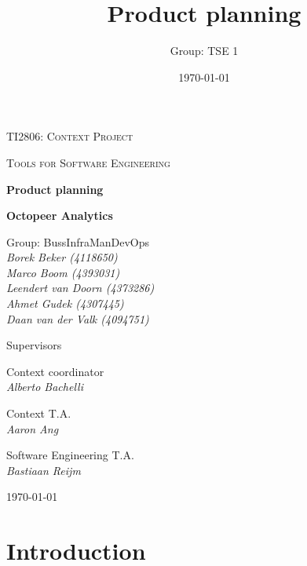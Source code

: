 \documentclass{article}
\title{Product planning}
\author{Group: TSE 1}
\date{\today}
\begin{document}
\begin{titlepage}
	\centering
	{\scshape\LARGE TI2806: Context Project \par}
	\vspace{1cm}
	{\scshape\Large Tools for Software Engineering\par}
	\vspace{1.5cm}
	{\huge\bfseries Product planning\par}
	\vspace{0.5cm}
	{\Large\bfseries Octopeer Analytics\par}
	\vspace{2cm}
	{\Large
	  Group: BussInfraManDevOps \\
	  \vspace{0.5cm}
	  \itshape
        Borek Beker \textnormal{(4118650)}\\
        Marco Boom \textnormal{(4393031)}\\
        Leendert van Doorn \textnormal{(4373286)}\\
        Ahmet Gudek \textnormal{(4307445)}\\
        Daan van der Valk \textnormal{(4094751)}\\
    \par}
\vspace{1cm}
	{\LARGE
	  Supervisors \\
	  \Large
	  \vspace{0.2cm}
        
        \begin{multicols}{3}
        Context coordinator\\
        \textit{Alberto Bachelli}
        \columnbreak
        
        
        Context T.A.\\
        \textit{Aaron Ang}\\
        \columnbreak
        
        
        Software Engineering T.A.\\
        \textit{Bastiaan Reijm}\\
        \end{multicols}
    \par}
	\vfill

	{\large \today\par}
\end{titlepage}

\section{Introduction}
\end{document}
